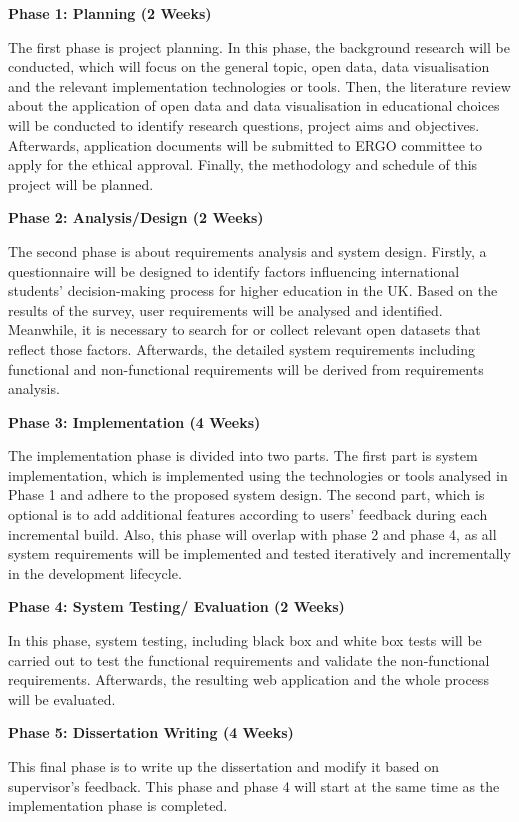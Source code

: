 \textbf{Phase 1: Planning (2 Weeks)}

The first phase is project planning. In this phase, the background research will be conducted, which will focus on the general topic, open data, data visualisation and the relevant implementation technologies or tools. Then, the literature review about the application of open data and data visualisation in educational choices will be conducted to identify research questions, project aims and objectives. Afterwards, application documents will be submitted to ERGO committee to apply for the ethical approval. Finally, the methodology and schedule of this project will be planned.

\textbf{Phase 2: Analysis/Design (2 Weeks)}

The second phase is about requirements analysis and system design. Firstly, a questionnaire will be designed to identify factors influencing international students’ decision-making process for higher education in the UK. Based on the results of the survey, user requirements will be analysed and identified. Meanwhile, it is necessary to search for or collect relevant open datasets that reflect those factors. Afterwards, the detailed system requirements including functional and non-functional requirements will be derived from requirements analysis.

\textbf{Phase 3: Implementation (4 Weeks)}

The implementation phase is divided into two parts. The first part is system implementation, which is implemented using the technologies or tools analysed in Phase 1 and adhere to the proposed system design. The second part, which is optional is to add additional features according to users’ feedback during each incremental build. Also, this phase will overlap with phase 2 and phase 4, as all system requirements will be implemented and tested iteratively and incrementally in the development lifecycle.

\textbf{Phase 4: System Testing/ Evaluation (2 Weeks)}

In this phase, system testing, including black box and white box tests will be carried out to test the functional requirements and validate the non-functional requirements. Afterwards, the resulting web application and the whole process will be evaluated.

\textbf{Phase 5: Dissertation Writing (4 Weeks)}

This final phase is to write up the dissertation and modify it based on supervisor’s feedback. This phase and phase 4 will start at the same time as the implementation phase is completed.



